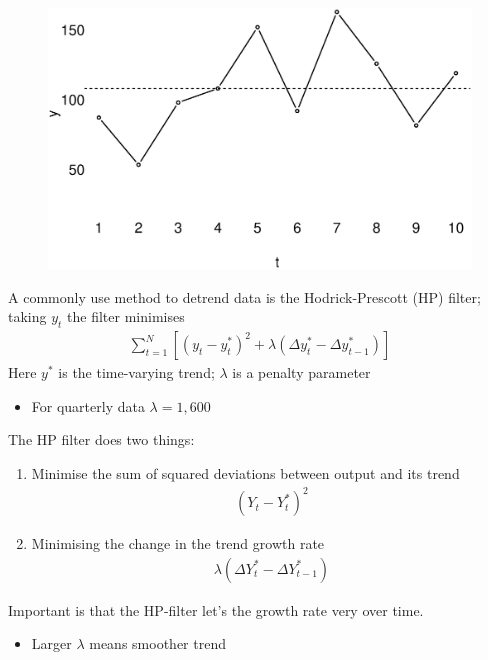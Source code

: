 \documentclass{beamer}
\begin{document}
\begin{frame}
  \begin{figure}
    \includegraphics[scale=.4]{mean_reversion.eps}
  \end{figure}
\end{frame}

\begin{frame}
 A commonly use method to detrend data is the Hodrick-Prescott (HP) filter; taking $y_t$ the filter minimises
\begin{align}
 \sum_{t=1}^{N} [(y_t - y_t^*)^2+ \lambda(\Delta y_t^* - \Delta y_{t-1}^*)]
\end{align}
\medskip
Here $y^*$ is the time-varying trend; $\lambda$ is a penalty parameter
\begin{itemize}
  \item For quarterly data $\lambda=1,600$
\end{itemize}
\end{frame}

\begin{frame}
  The HP filter does two things:
  \begin{enumerate}
    \item Minimise the sum of squared deviations between output and its trend
    \begin{align}
      (Y_t - Y_t^*)^2
    \end{align}
    \item Minimising the change in the trend growth rate
    \begin{align}
      \lambda(\Delta Y_t^* - \Delta Y_{t-1}^*)
    \end{align}
  \end{enumerate}
  \medskip
  Important is that the HP-filter let's the growth rate very over time.
  \begin{itemize}
    \item Larger $\lambda$ means smoother trend
  \end{itemize}
\end{frame}
\end{document}
